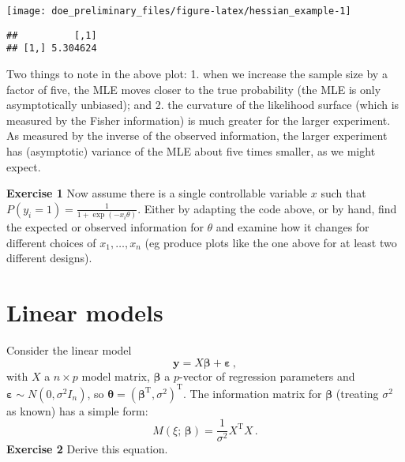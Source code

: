 \documentclass[
]{article}
\newenvironment{Shaded}{\begin{snugshade}}{\end{snugshade}}
\newcommand{\NormalTok}[1]{#1}
\newcommand{\SpecialCharTok}[1]{\textcolor[rgb]{0.00,0.00,0.00}{#1}}
\begin{document}
\begin{center}\texttt{[image: doe\_preliminary\_files/figure-latex/hessian\_example-1]} \end{center}

\begin{Shaded}
\end{Shaded}

\begin{verbatim}
##          [,1]
## [1,] 5.304624
\end{verbatim}

Two things to note in the above plot: 1. when we increase the sample
size by a factor of five, the MLE moves closer to the true probability
(the MLE is only asymptotically unbiased); and 2. the curvature of the
likelihood surface (which is measured by the Fisher information) is much
greater for the larger experiment. As measured by the inverse of the
observed information, the larger experiment has (asymptotic) variance of
the MLE about five times smaller, as we might expect.

\textbf{Exercise 1} Now assume there is a single controllable variable
\(x\) such that \(P(y_i = 1) = \frac{1}{1+\exp(-x_i\theta)}\). Either by
adapting the code above, or by hand, find the expected or observed
information for \(\theta\) and examine how it changes for different
choices of \(x_1,\ldots, x_n\) (eg produce plots like the one above for
at least two different designs).

\hypertarget{linear-models}{%
\section{Linear models}\label{linear-models}}

Consider the linear model \[
\boldsymbol{y}= X\boldsymbol{\beta}+ \boldsymbol{\varepsilon}\,,
\] with \(X\) a \(n\times p\) model matrix, \(\boldsymbol{\beta}\) a
\(p\)-vector of regression parameters and
\(\boldsymbol{\varepsilon}\sim N(0, \sigma^2 I_n)\), so
\(\boldsymbol{\theta}= (\boldsymbol{\beta}^\mathrm{T}, \sigma^2)^\mathrm{T}\).
The information matrix for \(\boldsymbol{\beta}\) (treating \(\sigma^2\)
as known) has a simple form: \[
M(\xi;\,\boldsymbol{\beta}) = \frac{1}{\sigma^2}X^\mathrm{T}X\,.
\] \textbf{Exercise 2} Derive this equation.
\end{document}
